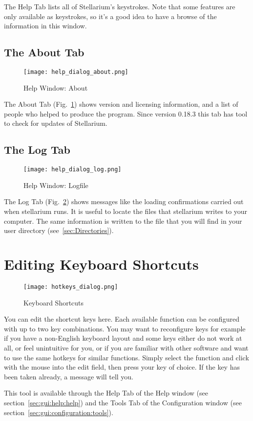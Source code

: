 \noindent The Help Tab lists all of Stellarium's keystrokes. Note that some
features are only available as keystrokes, so it's a good idea to have
a browse of the information in this window.

\subsection{The About Tab}
\label{sec:gui:help:about}
\begin{figure}[htbp]
\centering\texttt{[image: help\_dialog\_about.png]}
\caption{Help Window: About}
\label{fig:gui:help:about}
\end{figure}

The About Tab (Fig.~\ref{fig:gui:help:about}) shows version and licensing information, and a list of people who helped to produce the program.
Since version 0.18.3  this tab has tool to check for updates of Stellarium.

\subsection{The Log Tab}
\label{sec:gui:help:log}
\begin{figure}[htbp]
\centering\texttt{[image: help\_dialog\_log.png]}
\caption{Help Window: Logfile}
\label{fig:gui:help:log}
\end{figure}

The Log Tab (Fig.~\ref{fig:gui:help:log}) shows messages like the loading confirmations carried out when
stellarium runs. It is useful to locate the files that stellarium writes
to your computer. The same information is written to  the file  that you will
find in your user directory (see~\ref{sec:Directories}).

\section{Editing Keyboard Shortcuts}
\label{sec:gui:help:hotkeys}

\begin{figure}[htbp]
\centering\texttt{[image: hotkeys\_dialog.png]}
\caption{Keyboard Shortcuts}
\label{fig:gui:hotkeys}
\end{figure}

You can edit the shortcut keys here. Each available function can be
configured with up to two key combinations. You may want to
reconfigure keys for example if you have a non-English keyboard layout
and some keys either do not work at all, or feel unintuitive for you,
or if you are familiar with other software and want to use the same
hotkeys for similar functions. Simply select the function and click
with the mouse into the edit field, then press your key of choice. If
the key has been taken already, a message will tell you.

This tool is available through the Help Tab of the Help window (see section~\ref{sec:gui:help:help}) and the
Tools Tab of the Configuration window (see section~\ref{sec:gui:configuration:tools}).



